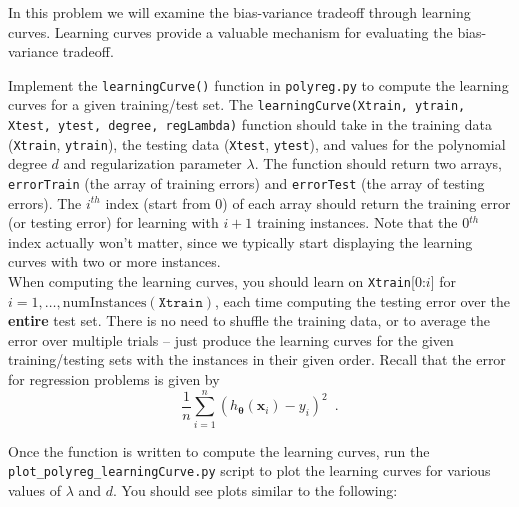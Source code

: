 \documentclass{article}
\begin{document}
\begin{aprob}
     In this problem we will examine the bias-variance tradeoff through learning curves. Learning curves provide a valuable mechanism for evaluating the bias-variance tradeoff. 
    
        \item  Implement the \texttt{learningCurve()} function in \texttt{polyreg.py} to compute the learning curves for a given training/test set.  The \texttt{learningCurve(Xtrain, ytrain, Xtest, ytest, degree, regLambda)} function should take in the training data (\texttt{Xtrain}, \texttt{ytrain}), the testing data (\texttt{Xtest}, \texttt{ytest}), and values for the polynomial degree $d$ and regularization parameter $\lambda$. The function should return two arrays, \texttt{errorTrain} (the array of training errors) and \texttt{errorTest} (the array of testing errors).  The $i^{th}$ index (start from 0) of each array should return the training error (or testing error) for learning with $i +1$ training instances.  Note that the 0$^{th}$ index actually won't matter, since we typically start displaying the learning curves with two or more instances.\\
    
    When computing the learning curves, you should learn on \texttt{Xtrain}[0:$i$] for $i = 1, \ldots, \text{numInstances}(\texttt{Xtrain})$, each time computing the testing error over the {\bf entire} test set.  There is no need to shuffle the training data, or to average the error over multiple trials -- just produce the learning curves for the given training/testing sets with the instances in their given order.  Recall that the error for regression problems is given by
    \begin{equation}
        \frac{1}{n} \sum_{i=1}^n (h_{\bm{\theta}}(\mathbf{x}_i) - y_i)^2 \enspace.
    \end{equation}
    
    \item Once the function is written to compute the learning curves, run the \texttt{plot\_polyreg\_learningCurve.py} script to plot the learning curves for various values of $\lambda$ and $d$.  You should see plots similar to the following:
    

\end{aprob}
\end{document}
